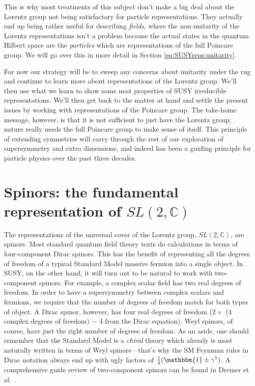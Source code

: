 \documentclass[12pt]{article}
\numberwithin{equation}{section}    %
\begin{document}
This is why most treatments of this subject don't make a big deal about the Lorentz group not being satisfactory for particle representations. They actually end up being rather useful for describing \textit{fields}, where the non-unitarity of the Lorentz representations isn't a problem because the actual states in the quantum Hilbert space are the \textit{particles} which are representations of the full Poincare group. We will go over this in more detail in Section \ref{eq:SUSYreps:unitarity}. 

For now our strategy will be to sweep any concerns about unitarity under the rug and continue to learn more about representations of the Lorentz group. We'll then use what we learn to show some neat properties of SUSY irreducible representations. We'll then get back to the matter at hand and settle the present issues by working with representations of the Poincare group. The take-home message, however, is that it is not sufficient to just have the Lorentz group; nature really needs the full Poincare group to make sense of itself. This principle of extending symmetries will carry through the rest of our exploration of supersymmetry and extra dimensions, and indeed has been a guiding principle for particle physics over the past three decades. 

\section{Spinors: the fundamental representation of $SL(2,\mathbb{C})$}\label{sec:susyalg:repsofsl2c}

The representations of the universal cover of the Lorentz group, $SL(2,\mathbb C)$, are spinors. Most standard quantum field theory texts do calculations in terms of four-component Dirac spinors. This has the benefit of representing all the degrees of freedom of a typical Standard Model massive fermion into a single object. In SUSY, on the other hand, it will turn out to be natural to work with two-component spinors. For example, a complex scalar field has two real degrees of freedom. In order to have a supersymmetry between complex scalars and fermions, we require that the number of degrees of freedom match for both types of object. A Dirac spinor, however, has four real degrees of freedom ($2 \times$ (4 complex degrees of freedom) $-$ 4 from the Dirac equation). Weyl spinors, of course, have just the right number of degrees of freedom. As an aside, one should remember that the Standard Model is a \textit{chiral} theory which already is most naturally written in terms of Weyl spinors---that's why the SM Feynman rules in Dirac notation always end up with ugly factors of $\frac{1}{2}(\mathbbm{1}\pm\gamma^5)$.  A comprehensive guide review of two-component spinors can be found in Dreiner et al.~\cite{Dreiner:2008tw}.
\end{document}

